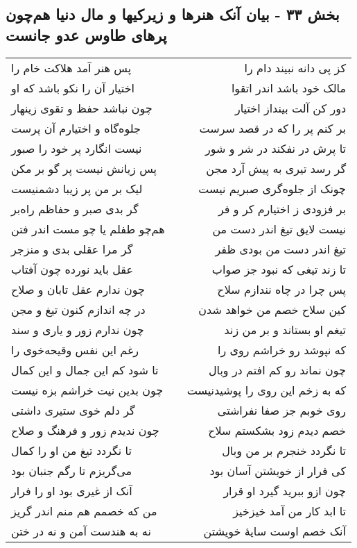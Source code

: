 \begin{center}
\section*{بخش ۳۳ - بیان آنک هنرها و زیرکیها و مال دنیا هم‌چون پرهای طاوس عدو جانست}
\label{sec:sh033}
\begin{longtable}{l p{0.5cm} r}
پس هنر آمد هلاکت خام را
&&
کز پی دانه نبیند دام را
\\
اختیار آن را نکو باشد که او
&&
مالک خود باشد اندر اتقوا
\\
چون نباشد حفظ و تقوی زینهار
&&
دور کن آلت بینداز اختیار
\\
جلوه‌گاه و اختیارم آن پرست
&&
بر کنم پر را که در قصد سرست
\\
نیست انگارد پر خود را صبور
&&
تا پرش در نفکند در شر و شور
\\
پس زیانش نیست پر گو بر مکن
&&
گر رسد تیری به پیش آرد مجن
\\
لیک بر من پر زیبا دشمنیست
&&
چونک از جلوه‌گری صبریم نیست
\\
گر بدی صبر و حفاظم راه‌بر
&&
بر فزودی ز اختیارم کر و فر
\\
هم‌چو طفلم یا چو مست اندر فتن
&&
نیست لایق تیغ اندر دست من
\\
گر مرا عقلی بدی و منزجر
&&
تیغ اندر دست من بودی ظفر
\\
عقل باید نورده چون آفتاب
&&
تا زند تیغی که نبود جز صواب
\\
چون ندارم عقل تابان و صلاح
&&
پس چرا در چاه نندازم سلاح
\\
در چه اندازم کنون تیغ و مجن
&&
کین سلاح خصم من خواهد شدن
\\
چون ندارم زور و یاری و سند
&&
تیغم او بستاند و بر من زند
\\
رغم این نفس وقیحه‌خوی را
&&
که نپوشد رو خراشم روی را
\\
تا شود کم این جمال و این کمال
&&
چون نماند رو کم افتم در وبال
\\
چون بدین نیت خراشم بزه نیست
&&
که به زخم این روی را پوشیدنیست
\\
گر دلم خوی ستیری داشتی
&&
روی خوبم جز صفا نفراشتی
\\
چون ندیدم زور و فرهنگ و صلاح
&&
خصم دیدم زود بشکستم سلاح
\\
تا نگردد تیغ من او را کمال
&&
تا نگردد خنجرم بر من وبال
\\
می‌گریزم تا رگم جنبان بود
&&
کی فرار از خویشتن آسان بود
\\
آنک از غیری بود او را فرار
&&
چون ازو ببرید گیرد او قرار
\\
من که خصمم هم منم اندر گریز
&&
تا ابد کار من آمد خیزخیز
\\
نه به هندست آمن و نه در ختن
&&
آنک خصم اوست سایهٔ خویشتن
\\
\end{longtable}
\end{center}
